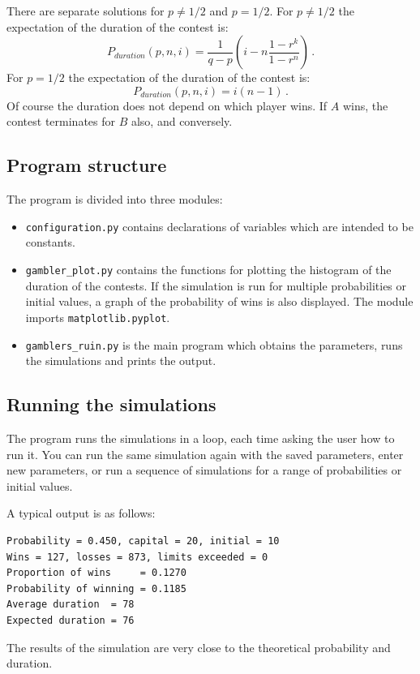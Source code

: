 There are separate solutions for $p\neq 1/2$ and $p=1/2$. For $p\neq 1/2$ the expectation of the duration of the contest is:
\[
P_{\mathit{duration}}(p,n,i)=\frac{1}{q-p}\left(i-n
\frac{1-r^k}{1-r^n}\right)\,.
\]
For $p=1/2$ the expectation of the duration of the contest is:
\[
P_{\mathit{duration}}(p,n,i)=i(n-1)\,.
\]
Of course the duration does not depend on which player wins. If $A$ wins, the contest terminates for $B$ also, and conversely.

\subsection{Program structure}

The program is divided into three modules:
\begin{itemize}
\item \verb+configuration.py+ contains declarations of variables which are intended to be constants.
\item \verb+gambler_plot.py+ contains the functions for plotting the histogram of the duration of the contests. If the simulation is run for multiple probabilities or initial values, a graph of the probability of wins is also displayed. The module imports \verb+matplotlib.pyplot+.
\item \verb+gamblers_ruin.py+ is the main program which obtains the parameters, runs the simulations and prints the output.
\end{itemize}

\subsection{Running the simulations}

The program runs the simulations in a loop, each time asking the user how to run it. You can run the same simulation again with the saved parameters, enter new parameters, or run a sequence of simulations for a range of probabilities or initial values.

A typical output is as follows:
\begin{verbatim}
Probability = 0.450, capital = 20, initial = 10
Wins = 127, losses = 873, limits exceeded = 0
Proportion of wins     = 0.1270
Probability of winning = 0.1185
Average duration  = 78
Expected duration = 76
\end{verbatim}
The results of the simulation are very close to the theoretical probability and duration.

